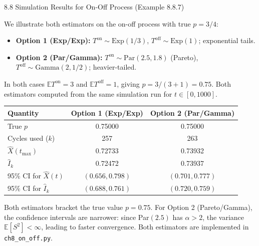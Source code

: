 \documentclass[aspectratio=169,10pt]{beamer}
\newcommand{\E}{\mathbb{E}}
\begin{document}
\begin{frame}[allowframebreaks]{8.8 Simulation Results for On-Off Process (Example 8.8.7)}

We illustrate both estimators on the on-off process with true $p = 3/4$:
\begin{itemize}
  \item \textbf{Option 1 (Exp/Exp):} $T^{\mathrm{on}}\sim\mathrm{Exp}(1/3)$,
        $T^{\mathrm{off}}\sim\mathrm{Exp}(1)$; exponential tails.
  \item \textbf{Option 2 (Par/Gamma):} $T^{\mathrm{on}}\sim\mathrm{Par}(2.5, 1.8)$
        (Pareto), $T^{\mathrm{off}}\sim\mathrm{Gamma}(2, 1/2)$; heavier-tailed.
\end{itemize}

In both cases $\E T^{\mathrm{on}} = 3$ and $\E T^{\mathrm{off}} = 1$, giving
$p = 3/(3+1) = 0.75$.  Both estimators computed from the same simulation run
for $t \in [0, 1000]$.

\begin{center}
\begin{tabular}{lcc}
  \toprule
  Quantity & Option 1 (Exp/Exp) & Option 2 (Par/Gamma) \\
  \midrule
  True $p$ & 0.75000 & 0.75000 \\
  Cycles used ($k$) & 257 & 263 \\
  $\hat{X}(t_{\max})$ & 0.72733 & 0.73932 \\
  $\hat{I}_k$ & 0.72472 & 0.73937 \\
  95\% CI for $\hat{X}(t)$ & $(0.656, 0.798)$ & $(0.701, 0.777)$ \\
  95\% CI for $\hat{I}_k$ & $(0.688, 0.761)$ & $(0.720, 0.759)$ \\
  \bottomrule
\end{tabular}
\end{center}

Both estimators bracket the true value $p=0.75$.  For Option 2 (Pareto/Gamma),
the confidence intervals are narrower: since Par$(2.5)$ has $\alpha > 2$, the
variance $\E[S^2] < \infty$, leading to faster convergence.  Both estimators are
implemented in \texttt{ch8\_on\_off.py}.

\end{frame}
\end{document}
